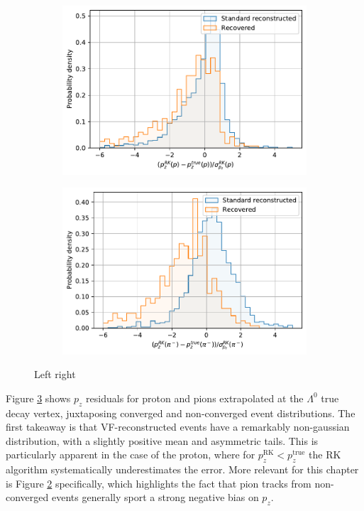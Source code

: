 \begin{figure}[t]
	\centering
	\begin{subfigure}{.45\textwidth}
		\includegraphics[width=\textwidth]{graphics/03-vertex_reconstruction/p_momentum_residual_2Dv3D_z_rel.pdf}
		\caption{}
		\label{fig:p_momentum_residual_2Dv3D_z_rel}
	\end{subfigure}
	\begin{subfigure}{.45\textwidth}
		\includegraphics[width=\textwidth]{graphics/03-vertex_reconstruction/pim_momentum_residual_2Dv3D_z_rel.pdf}
		\caption{}
		\label{fig:pim_momentum_residual_2Dv3D_z_rel}
	\end{subfigure}
	\caption[A and b.]{Left right}
	\label{fig:p_pim_momentum_residual_2Dv3D_z_rel}
\end{figure}

Figure \ref{fig:p_pim_momentum_residual_2Dv3D_z_rel} shows $p_z$ residuals for proton and pions extrapolated at the $\Lambda^0$ true decay vertex, juxtaposing converged and non-converged event distributions.
The first takeaway is that VF-reconstructed events have a remarkably non-gaussian distribution, with a slightly positive mean and asymmetric tails. 
This is particularly apparent in the case of the proton, where for $p_z^\text{RK} < p_z^\text{true}$ the RK algorithm systematically underestimates the error.
More relevant for this chapter is Figure \ref{fig:pim_momentum_residual_2Dv3D_z_rel} specifically, which highlights the fact that pion tracks from non-converged events generally sport a strong negative bias on $p_z$.

